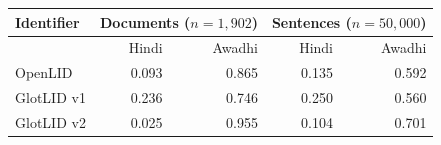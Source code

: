 \begin{tabular}{lrrrr}
\toprule
Identifier & \multicolumn{2}{c}{Documents ($n=1{,}902$)} & \multicolumn{2}{c}{Sentences ($n=50{,}000$)} \\
\midrule
 & Hindi & Awadhi & Hindi & Awadhi \\
OpenLID & 0.093 & 0.865 & 0.135 & 0.592 \\
GlotLID v1 & 0.236 & 0.746 & 0.250 & 0.560 \\
GlotLID v2 & 0.025 & 0.955 & 0.104 & 0.701 \\
\bottomrule
\end{tabular}
